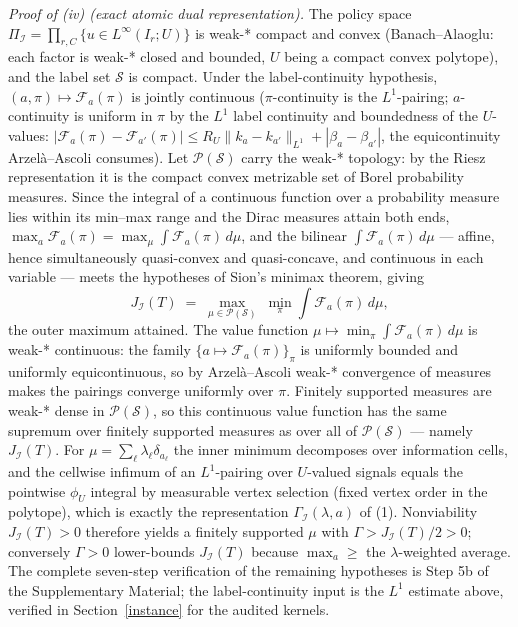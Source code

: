 \documentclass[10pt,twocolumn]{article}
\theoremstyle{plain}
\theoremstyle{definition}
\theoremstyle{remark}
\begin{document}
\emph{Proof of (iv) (exact atomic dual representation).} The policy space
\(\Pi_{\mathcal{I}} = \prod_{r,C}\{u \in L^\infty(I_r; U)\}\) is
weak-* compact and convex (Banach--Alaoglu: each factor is weak-* closed
and bounded, \(U\) being a compact convex polytope), and the label set
\(\mathscr{S}\) is compact. Under the label-continuity hypothesis,
\((a, \pi) \mapsto \mathcal{F}_a(\pi)\) is jointly continuous
(\(\pi\)-continuity is the \(L^1\)-pairing; \(a\)-continuity is
uniform in \(\pi\) by the \(L^1\) label continuity and boundedness of
the \(U\)-values: \(|\mathcal{F}_a(\pi) - \mathcal{F}_{a'}(\pi)| \le
R_U \|k_a - k_{a'}\|_{L^1} + |\beta_a - \beta_{a'}|\), the equicontinuity
Arzel\`a--Ascoli consumes). Let \(\mathcal{P}(\mathscr{S})\) carry the weak-*
topology: by the Riesz representation it is the compact convex metrizable
set of Borel probability measures. Since the integral of a continuous
function over a probability measure lies within its min--max range and
the Dirac measures attain both ends,
\(\max_a \mathcal{F}_a(\pi) = \max_\mu \int
\mathcal{F}_a(\pi)\,d\mu\), and the bilinear
\(\int \mathcal{F}_a(\pi)\,d\mu\) --- affine, hence simultaneously
quasi-convex and quasi-concave, and continuous in each variable --- meets
the hypotheses of Sion's minimax theorem, giving
\[
J_{\mathcal{I}}(T) \;=\; \max_{\mu \in \mathcal{P}(\mathscr{S})}
\; \min_{\pi} \int \mathcal{F}_a(\pi)\,d\mu,
\]
the outer maximum attained. The value function
\(\mu \mapsto \min_\pi \int \mathcal{F}_a(\pi)\,d\mu\) is weak-*
continuous: the family \(\{a \mapsto \mathcal{F}_a(\pi)\}_{\pi}\)
is uniformly bounded and uniformly equicontinuous, so by
Arzel\`a--Ascoli weak-* convergence of measures makes the pairings
converge uniformly over \(\pi\). Finitely supported measures are weak-*
dense in \(\mathcal{P}(\mathscr{S})\), so this continuous value
function has the same supremum over finitely supported measures as over
all of \(\mathcal{P}(\mathscr{S})\) --- namely \(J_{\mathcal{I}}(T)\).
For \(\mu = \sum_\ell \lambda_\ell \delta_{a_\ell}\) the inner
minimum decomposes over information cells, and the cellwise infimum of an
\(L^1\)-pairing over \(U\)-valued signals equals the pointwise
\(\phi_U\) integral by measurable vertex selection (fixed vertex order
in the polytope), which is exactly the representation
\(\Gamma_{\mathcal{I}}(\lambda, a)\) of (1). Nonviability
\(J_{\mathcal{I}}(T) > 0\) therefore yields a finitely supported
\(\mu\) with \(\Gamma > J_{\mathcal{I}}(T)/2 > 0\); conversely
\(\Gamma > 0\) lower-bounds \(J_{\mathcal{I}}(T)\) because
\(\max_a \ge \) the \(\lambda\)-weighted average. The complete
seven-step verification of the remaining hypotheses is Step 5b of the
Supplementary Material; the label-continuity input is the \(L^1\)
estimate above, verified in Section~\ref{instance} for the audited
kernels.
\end{document}

